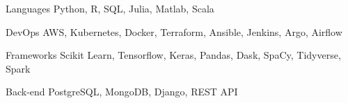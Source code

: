 

\begin{cvskills}

  \cvskill
    {Languages} %
    {Python, R, SQL, Julia, Matlab, Scala} %

  \cvskill
    {DevOps} %
    {AWS, Kubernetes, Docker, Terraform, Ansible, Jenkins, Argo, Airflow} %

  \cvskill
    {Frameworks} %
    {Scikit Learn, Tensorflow, Keras, Pandas, Dask, SpaCy, Tidyverse, Spark} %

  \cvskill
    {Back-end} %
    {PostgreSQL, MongoDB, Django, REST API } %

\end{cvskills}
